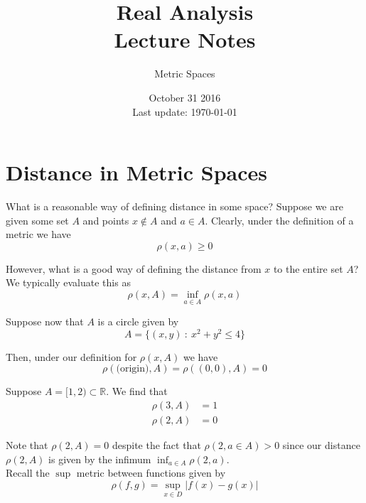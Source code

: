 \documentclass[12pt]{article}
\newlength\tindent
\renewcommand{\indent}{\hspace*{\tindent}}
\newcommand{\R}{\mathbb R}
\begin{document}
 
 
\title{Real Analysis\\Lecture Notes}
\author{Metric Spaces}
\date{October 31 2016 \\ Last update: \today{}}
\maketitle

\section{Distance in Metric Spaces}

\indent What is a reasonable way of defining distance in some space? Suppose we are given some set $A$ and points $x \notin A$ and $a \in A$. Clearly, under the definition of a metric we have
\begin{equation*}
	\rho(x, a) \geq 0
\end{equation*}

\indent However, what is a good way of defining the distance from $x$ to the entire set $A$? We typically evaluate this as
\begin{equation*}
	\rho(x, A) = \inf_{a\in A} \rho(x,a)
\end{equation*}

Suppose now that $A$ is a circle given by
\begin{equation*}
	A = \{(x,y) ~:~ x^2 + y^2 \leq 4\}
\end{equation*}

Then, under our definition for $\rho(x,A)$ we have
\begin{equation*}
	\rho(\text{(origin)}, A) = \rho((0,0), A) = 0
\end{equation*}

Suppose $A = [1,2) \subset \R$. We find that
\begin{align*}
	\rho(3, A) &= 1 \\
	\rho(2, A) &= 0
\end{align*}

\indent Note that $\rho(2, A) = 0$ despite the fact that $\rho(2, a \in A) > 0$ since our distance $\rho(2, A)$ is given by the infimum $\inf_{a \in A} \rho(2, a)$. \\

Recall the $\sup$ metric between functions given by
\begin{equation*}
	\rho(f,g) = \sup_{x\in D} |f(x) - g(x)|	
\end{equation*}
\end{document}
